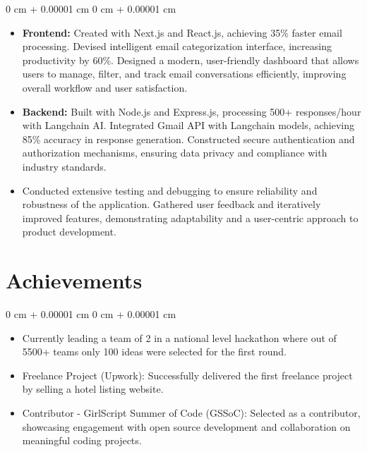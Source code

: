 \documentclass[10pt, letterpaper]{article}
\newenvironment{highlights}{
    \begin{itemize}[
        topsep=0.02 cm,
        parsep=0.02 cm,
        partopsep=0pt,
        itemsep=0pt,
        leftmargin=0 cm + 10pt
    ]
}{
    \end{itemize}
} %
\newenvironment{onecolentry}{
    \begin{adjustwidth}{
        0 cm + 0.00001 cm
    }{
        0 cm + 0.00001 cm
    }
}{
    \end{adjustwidth}
} %
\begin{document}
    \begin{onecolentry}
        \begin{highlights}
            \item \textbf{Frontend:} Created with Next.js and React.js, achieving 35\% faster email processing. Devised intelligent email categorization interface, increasing productivity by 60\%. Designed a modern, user-friendly dashboard that allows users to manage, filter, and track email conversations efficiently, improving overall workflow and user satisfaction.
            \item \textbf{Backend:} Built with Node.js and Express.js, processing 500+ responses/hour with Langchain AI. Integrated Gmail API with Langchain models, achieving 85\% accuracy in response generation. Constructed secure authentication and authorization mechanisms, ensuring data privacy and compliance with industry standards.
            \item Conducted extensive testing and debugging to ensure reliability and robustness of the application. Gathered user feedback and iteratively improved features, demonstrating adaptability and a user-centric approach to product development.
        \end{highlights}
    \end{onecolentry}

    \section{Achievements}

    \begin{onecolentry}
        \begin{highlights}
            \item Currently leading a team of 2 in a national level hackathon where out of 5500+ teams only 100 ideas were selected for the first round.
            \item Freelance Project (Upwork): Successfully delivered the first freelance project by selling a hotel listing website.
             \item Contributor - GirlScript Summer of Code (GSSoC): Selected as a contributor, showcasing engagement with open source development and collaboration on meaningful coding projects.
        \end{highlights}
    \end{onecolentry}
\end{document}
